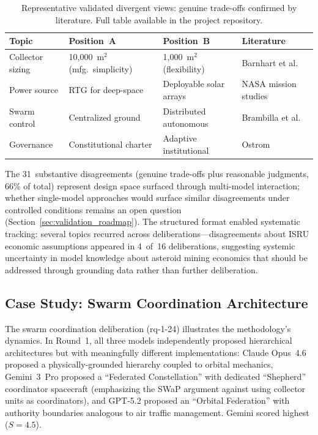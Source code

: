 \documentclass[11pt,a4paper]{article}
\begin{document}
\begin{table}[ht]
\centering
\caption{Representative validated divergent views: genuine trade-offs confirmed by literature. Full table available in the project repository.}
\label{tab:validated_divergent}
\begin{tabular}{@{}p{2.2cm}p{3.2cm}p{3.2cm}p{4cm}@{}}
\toprule
\textbf{Topic} & \textbf{Position~A} & \textbf{Position~B} & \textbf{Literature} \\
\midrule
Collector sizing & 10{,}000~m$^2$ (mfg.\ simplicity) & 1{,}000~m$^2$ (flexibility) & Barnhart et al.~\cite{barnhart2007smallsat} \\
Power source & RTG for deep-space & Deployable solar arrays & NASA mission studies~\cite{nasa2020se} \\
Swarm control & Centralized ground & Distributed autonomous & Brambilla et al.~\cite{brambilla2013swarm} \\
Governance & Constitutional charter & Adaptive institutional & Ostrom~\cite{ostrom1990governing} \\
\bottomrule
\end{tabular}
\end{table}

The 31~substantive disagreements (genuine trade-offs plus reasonable judgments, 66\% of total) represent design space surfaced through multi-model interaction; whether single-model approaches would surface similar disagreements under controlled conditions remains an open question (Section~\ref{sec:validation_roadmap}). The structured format enabled systematic tracking: several topics recurred across deliberations---disagreements about ISRU economic assumptions appeared in 4~of~16 deliberations, suggesting systemic uncertainty in model knowledge about asteroid mining economics that should be addressed through grounding data rather than further deliberation.

\subsection{Case Study: Swarm Coordination Architecture}

The swarm coordination deliberation (rq-1-24) illustrates the methodology's dynamics. In Round~1, all three models independently proposed hierarchical architectures but with meaningfully different implementations: Claude Opus~4.6 proposed a physically-grounded hierarchy coupled to orbital mechanics, Gemini~3~Pro proposed a ``Federated Constellation'' with dedicated ``Shepherd'' coordinator spacecraft (emphasizing the SWaP argument against using collector units as coordinators), and GPT-5.2 proposed an ``Orbital Federation'' with authority boundaries analogous to air traffic management. Gemini scored highest ($S = 4.5$).
\end{document}

